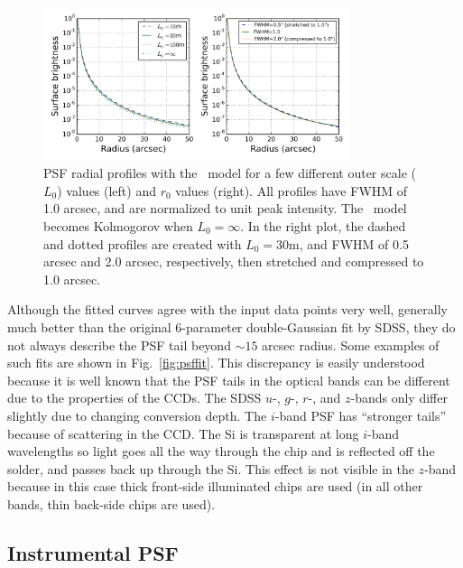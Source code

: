 \begin{figure}[ht]
\centering
\includegraphics[width=0.8\textwidth]{FIGURES/vonK.png}
\vskip -0.2in 
\caption{PSF radial profiles with the \vk~model for a few different
  outer scale ($L_0$) values (left) and $r_0$ values (right). 
All profiles have FWHM of 1.0 arcsec, and
  are normalized to unit peak intensity. The \vk~model becomes
  Kolmogorov when $L_0 = \infty$.
In the right plot, the dashed and dotted profiles are created with
$L_0 = 30$m, and 
FWHM of 0.5 arcsec and 2.0 arcsec, respectively, then stretched and compressed to 1.0 arcsec.
\label{fig:vonK}}
\end{figure}




Although the fitted
curves agree with the input data points very well, generally much better than the
original 6-parameter double-Gaussian fit by SDSS, they do not always describe
the PSF tail beyond $\sim 15$ arcsec radius. 
Some examples of such fits are shown in Fig.~\ref{fig:psffit}.
This discrepancy is easily understood
because it is well known that the PSF tails in the optical bands can be 
different due to the properties of the CCDs.
The SDSS $u$-, $g$-, $r$-, and $z$-bands only differ slightly due to
changing conversion depth.
The $i$-band PSF has ``stronger tails''
because of scattering in the CCD.  The Si is transparent at long $i$-band wavelengths 
so light goes all the way through the chip and is reflected off the solder, and passes 
back up through the Si. This effect is not visible in the $z$-band because in this case
thick front-side illuminated chips are used (in all other bands, thin back-side chips are used). 



\subsection{Instrumental PSF \label{sec:instrPSF}} 

